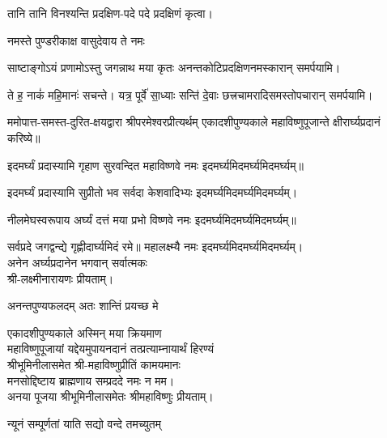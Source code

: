 \begin{center}
{तानि तानि विनश्यन्ति प्रदक्षिण-पदे पदे}
प्रदक्षिणं कृत्वा।

{नमस्ते पुण्डरीकाक्ष वासुदेवाय ते नमः}

{साष्टाङ्गोऽयं प्रणामोऽस्तु जगन्नाथ मया कृतः}
अनन्तकोटिप्रदक्षिणनमस्कारान् समर्पयामि।\medskip

{ते ह॒ नाकं॑ महि॒मानः॑ सचन्ते। यत्र॒ पूर्वे॑ सा॒ध्याः सन्ति॑ दे॒वाः}
छत्त्रचामरादिसमस्तोपचारान् समर्पयामि।\medskip

ममोपात्त-समस्त-दुरित-क्षयद्वारा श्रीपरमेश्वरप्रीत्यर्थम् एकादशीपुण्यकाले महाविष्णुपूजान्ते क्षीरार्घ्यप्रदानं करिष्ये॥
\medskip

{इदमर्घ्यं प्रदास्यामि गृहाण सुरवन्दित}
	महाविष्णवे नमः इदमर्घ्यमिदमर्घ्यमिदमर्घ्यम्॥\medskip

{इदमर्घ्यं प्रदास्यामि सुप्रीतो भव सर्वदा}
	केशवादिभ्यः इदमर्घ्यमिदमर्घ्यमिदमर्घ्यम्।\medskip

{नीलमेघस्वरूपाय अर्घ्यं दत्तं मया प्रभो}
	विष्णवे नमः इदमर्घ्यमिदमर्घ्यमिदमर्घ्यम्॥\medskip

{सर्वप्रदे जगद्वन्द्ये गृह्णीदार्घ्यमिदं रमे॥}
	महालक्ष्म्यै नमः इदमर्घ्यमिदमर्घ्यमिदमर्घ्यम्।\\
अनेन अर्घ्यप्रदानेन भगवान् सर्वात्मकः\\ श्री-लक्ष्मीनारायणः प्रीयताम्।\medskip

{अनन्तपुण्यफलदम् अतः शान्तिं प्रयच्छ मे}

एकादशीपुण्यकाले अस्मिन् मया क्रियमाण\\
महाविष्णुपूजायां यद्देयमुपायनदानं तत्प्रत्याम्नायार्थं हिरण्यं\\
श्रीभूमिनीलासमेत श्री-महाविष्णुप्रीतिं कामयमानः\\
मनसोद्दिष्टाय ब्राह्मणाय सम्प्रददे नमः न मम।\\
अनया पूजया श्रीभूमिनीलासमेतः श्रीमहाविष्णुः प्रीयताम्।


{न्यूनं सम्पूर्णतां याति सद्यो वन्दे तमच्युतम्}


\end{center}
